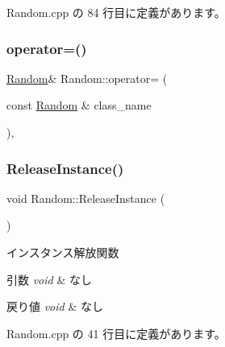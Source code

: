  Random.\+cpp の 84 行目に定義があります。

\mbox{\label{class_random_a233dc764071ecf4e95619ea86f7edf61}} 
\subsubsection{\texorpdfstring{operator=()}{operator=()}}
{\footnotesize\ttfamily \mbox{\hyperlink{class_random}{Random}}\& Random\+::operator= (\begin{DoxyParamCaption}\item[{const \mbox{\hyperlink{class_random}{Random}} \&}]{class\+\_\+name }\end{DoxyParamCaption})\hspace{0.3cm}{\ttfamily [private]}, {\ttfamily [delete]}}

\mbox{\label{class_random_aad4d635b6fddc21bedf7458b0ce49636}} 
\subsubsection{\texorpdfstring{Release\+Instance()}{ReleaseInstance()}}
{\footnotesize\ttfamily void Random\+::\+Release\+Instance (\begin{DoxyParamCaption}{ }\end{DoxyParamCaption})\hspace{0.3cm}{\ttfamily [static]}}



インスタンス解放関数 


\begin{DoxyParams}{引数}
{\em void} & なし \\
\hline
\end{DoxyParams}

\begin{DoxyRetVals}{戻り値}
{\em void} & なし \\
\hline
\end{DoxyRetVals}


 Random.\+cpp の 41 行目に定義があります。

\mbox{\label{class_random_a3bf09c7188122af5008037b46390c3e7}} 
